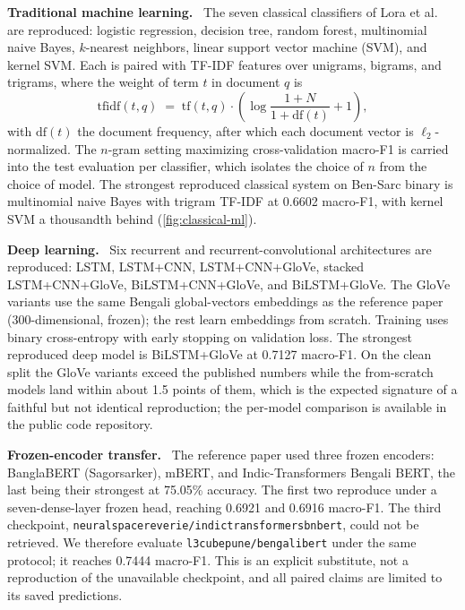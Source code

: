 \documentclass{ieeeaccess}
\newcommand{\dset}[1]{#1}
\newcommand{\runin}[1]{\smallskip\noindent\textbf{#1}\ }
\begin{document}
\runin{Traditional machine learning.} The seven classical classifiers of Lora et al.\ \cite{lora2025bensarc} are reproduced: logistic regression, decision tree, random forest, multinomial naive Bayes, $k$-nearest neighbors, linear support vector machine (SVM), and kernel SVM. Each is paired with TF-IDF features over unigrams, bigrams, and trigrams, where the weight of term $t$ in document $q$ is
\begin{equation}
\mathrm{tfidf}(t,q) \;=\; \mathrm{tf}(t,q)\cdot\left(\log\frac{1+N}{1+\mathrm{df}(t)} + 1\right),
\label{eq:tfidf}
\end{equation}
with $\mathrm{df}(t)$ the document frequency, after which each document vector is $\ell_2$-normalized. The $n$-gram setting maximizing cross-validation macro-F1 is carried into the test evaluation per classifier, which isolates the choice of $n$ from the choice of model. The strongest reproduced classical system on \dset{Ben-Sarc} binary is multinomial naive Bayes with trigram TF-IDF at 0.6602 macro-F1, with kernel SVM a thousandth behind (\cref{fig:classical-ml}).

\runin{Deep learning.} Six recurrent and recurrent-convolutional architectures are reproduced: LSTM, LSTM+CNN, LSTM+\allowbreak CNN+\allowbreak GloVe, stacked LSTM+\allowbreak CNN+\allowbreak GloVe, BiLSTM+\allowbreak CNN+\allowbreak GloVe, and BiLSTM+\allowbreak GloVe. The GloVe variants use the same Bengali global-vectors embeddings as the reference paper (300-dimensional, frozen); the rest learn embeddings from scratch. Training uses binary cross-entropy with early stopping on validation loss. The strongest reproduced deep model is BiLSTM+GloVe at 0.7127 macro-F1. On the clean split the GloVe variants exceed the published numbers while the from-scratch models land within about 1.5 points of them, which is the expected signature of a faithful but not identical reproduction; the per-model comparison is available in the public code repository.

\runin{Frozen-encoder transfer.} The reference paper used three frozen encoders: BanglaBERT (Sagorsarker), mBERT, and Indic-Transformers Bengali BERT, the last being their strongest at 75.05\% accuracy. The first two reproduce under a seven-dense-layer frozen head, reaching 0.6921 and 0.6916 macro-F1. The third checkpoint, \texttt{neuralspace\-reverie/\allowbreak indic\-transformers\-bn\-bert}, could not be retrieved. We therefore evaluate \texttt{l3cube\-pune/bengali\-bert} under the same protocol; it reaches 0.7444 macro-F1. This is an explicit substitute, not a reproduction of the unavailable checkpoint, and all paired claims are limited to its saved predictions.
\end{document}
